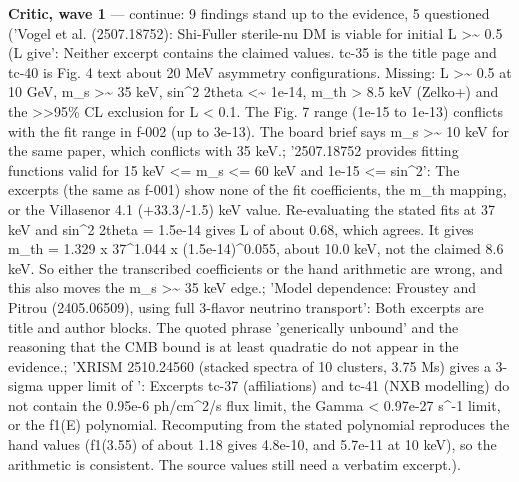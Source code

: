 \documentclass[11pt,a4paper]{article}
\begin{document}
\textbf{Critic, wave 1} --- continue: 9 findings stand up to the evidence, 5 questioned ('Vogel et al. (2507.18752): Shi-Fuller sterile-nu DM is viable for initial L \textgreater{}\textasciitilde{} 0.5 (L give': Neither excerpt contains the claimed values. tc-35 is the title page and tc-40 is Fig. 4 text about 20 MeV asymmetry configurations. Missing: L \textgreater{}\textasciitilde{} 0.5 at 10 GeV, m\_s \textgreater{}\textasciitilde{} 35 keV, sin\textasciicircum{}2 2theta \textless{}\textasciitilde{} 1e-14, m\_th \textgreater{} 8.5 keV (Zelko+) and the \textgreater{}\textgreater{}95\% CL exclusion for L \textless{} 0.1. The Fig. 7 range (1e-15 to 1e-13) conflicts with the fit range in f-002 (up to 3e-13). The board brief says m\_s \textgreater{}\textasciitilde{} 10 keV for the same paper, which conflicts with 35 keV.; '2507.18752 provides fitting functions valid for 15 keV \textless{}= m\_s \textless{}= 60 keV and 1e-15 \textless{}= sin\textasciicircum{}2': The excerpts (the same as f-001) show none of the fit coefficients, the m\_th mapping, or the Villasenor 4.1 (+33.3/-1.5) keV value. Re-evaluating the stated fits at 37 keV and sin\textasciicircum{}2 2theta = 1.5e-14 gives L of about 0.68, which agrees. It gives m\_th = 1.329 x 37\textasciicircum{}1.044 x (1.5e-14)\textasciicircum{}0.055, about 10.0 keV, not the claimed 8.6 keV. So either the transcribed coefficients or the hand arithmetic are wrong, and this also moves the m\_s \textgreater{}\textasciitilde{} 35 keV edge.; 'Model dependence: Froustey and Pitrou (2405.06509), using full 3-flavor neutrino transport': Both excerpts are title and author blocks. The quoted phrase 'generically unbound' and the reasoning that the CMB bound is at least quadratic do not appear in the evidence.; 'XRISM 2510.24560 (stacked spectra of 10 clusters, 3.75 Ms) gives a 3-sigma upper limit of ': Excerpts tc-37 (affiliations) and tc-41 (NXB modelling) do not contain the 0.95e-6 ph/cm\textasciicircum{}2/s flux limit, the Gamma \textless{} 0.97e-27 s\textasciicircum{}-1 limit, or the f1(E) polynomial. Recomputing from the stated polynomial reproduces the hand values (f1(3.55) of about 1.18 gives 4.8e-10, and 5.7e-11 at 10 keV), so the arithmetic is consistent. The source values still need a verbatim excerpt.).
\end{document}
